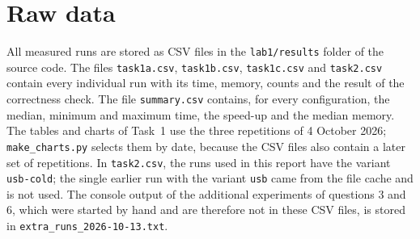 \documentclass[11pt,a4paper]{article}
\begin{document}
\section{Raw data}\label{app:data}

All measured runs are stored as CSV files in the \texttt{lab1/results} folder of the source code.
The files \texttt{task1a.csv}, \texttt{task1b.csv}, \texttt{task1c.csv} and \texttt{task2.csv}
contain every individual run with its time, memory, counts and the result of the correctness check.
The file \texttt{summary.csv} contains, for every configuration, the median, minimum and maximum
time, the speed-up and the median memory. The tables and charts of Task~1 use the three repetitions
of 4 October 2026; \texttt{make\_charts.py} selects them by date, because the CSV files also contain
a later set of repetitions. In \texttt{task2.csv}, the runs used in this report have the variant
\texttt{usb-cold}; the single earlier run with the variant \texttt{usb} came from the file cache and
is not used. The console
output of the additional experiments of questions 3 and 6, which were started by hand and are
therefore not in these CSV files, is stored in \texttt{extra\_runs\_2026-10-13.txt}.
\end{document}
